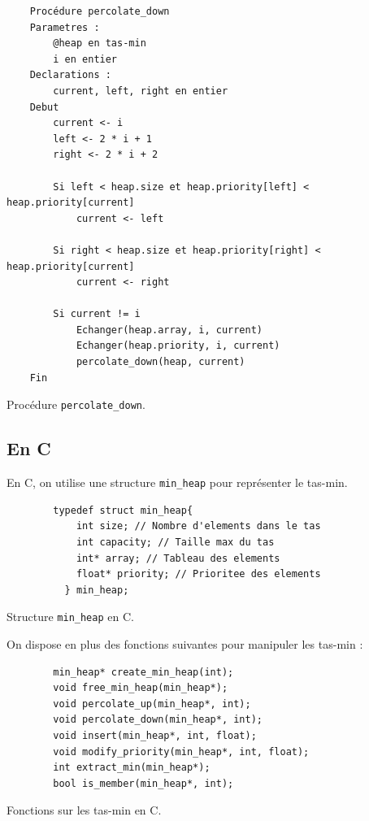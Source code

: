 \begin{listing}[!htpb]
    \begin{verbatim}
    Procédure percolate_down
    Parametres :
        @heap en tas-min
        i en entier
    Declarations :
        current, left, right en entier
    Debut
        current <- i
        left <- 2 * i + 1
        right <- 2 * i + 2

        Si left < heap.size et heap.priority[left] < heap.priority[current]
            current <- left
        
        Si right < heap.size et heap.priority[right] < heap.priority[current]
            current <- right
        
        Si current != i
            Echanger(heap.array, i, current)
            Echanger(heap.priority, i, current)
            percolate_down(heap, current)
    Fin
    \end{verbatim}
    \caption{Procédure \texttt{percolate\_down}.}
    \label{listing:percolate_down}
\end{listing}

\subsection{En C}

En C, on utilise une structure \texttt{min\_heap} pour représenter le tas-min.

\begin{listing}[!htpb]
    \begin{verbatim}
        typedef struct min_heap{
            int size; // Nombre d'elements dans le tas
            int capacity; // Taille max du tas
            int* array; // Tableau des elements
            float* priority; // Prioritee des elements
          } min_heap;
    \end{verbatim}
    \caption{Structure \texttt{min\_heap} en C.}
    \label{listing:c-min_heap}
\end{listing}

\newpage

On dispose en plus des fonctions suivantes pour manipuler les tas-min :

\begin{listing}[!htpb]
    \begin{verbatim}
        min_heap* create_min_heap(int);
        void free_min_heap(min_heap*);
        void percolate_up(min_heap*, int);
        void percolate_down(min_heap*, int);
        void insert(min_heap*, int, float);
        void modify_priority(min_heap*, int, float);
        int extract_min(min_heap*);
        bool is_member(min_heap*, int); 
    \end{verbatim}
    \caption{Fonctions sur les tas-min en C.}
    \label{listing:c-min_heap-fonctions}
\end{listing}

